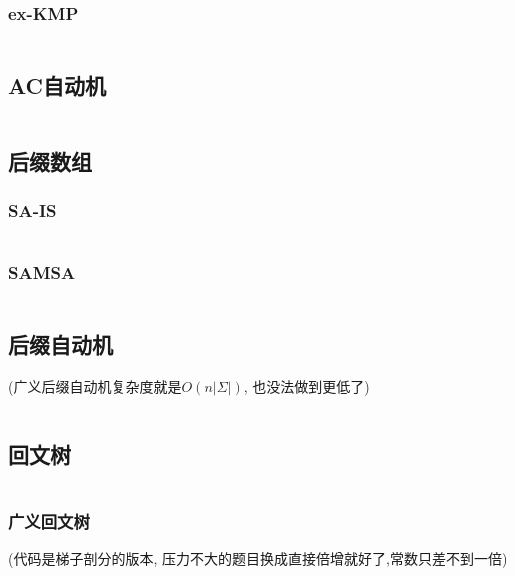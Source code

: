 \documentclass[a4paper]{article}
\begin{document}
\begin{multicols}{2}
				\subsubsection{ex-KMP}
					\inputminted{cpp}{../src/string/exKMP.cpp}

			\subsection{AC自动机}
				\inputminted{cpp}{../src/string/AC自动机.cpp}

			\subsection{后缀数组}
				\subsubsection{SA-IS}
					\inputminted{cpp}{../src/string/sais.cpp}
			
				\subsubsection{SAMSA}
				 	\inputminted{cpp}{../src/string/SAMSA.cpp}



			\subsection{后缀自动机}
				(广义后缀自动机复杂度就是$O\left(n\left|\Sigma\right|\right)$, 也没法做到更低了)
				\inputminted{cpp}{../src/string/后缀自动机.cpp}

			\subsection{回文树}
				\inputminted{cpp}{../src/string/回文树.cpp}

				\subsubsection{广义回文树}
					(代码是梯子剖分的版本, 压力不大的题目换成直接倍增就好了,常数只差不到一倍)
					\inputminted{cpp}{../src/string/广义回文树.cpp}




\end{multicols}
\end{document}
